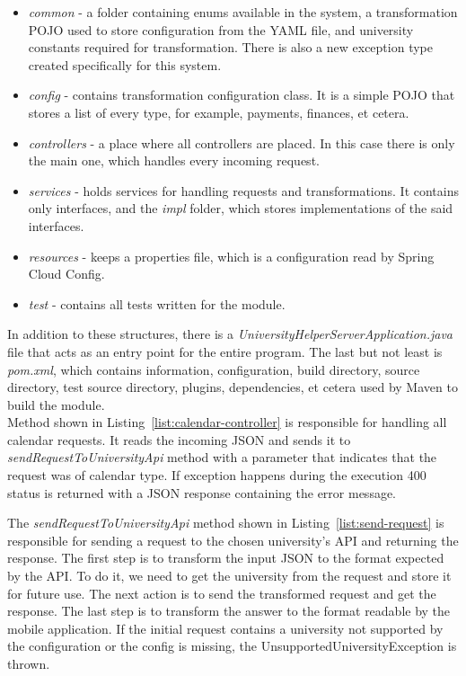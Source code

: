 \begin{itemize}
    \item \textit{common} - a folder containing enums available in the system, a transformation POJO used to store configuration from the YAML file, and university constants required for transformation. There is also a new exception type created specifically for this system.
    \item\textit{config} - contains transformation configuration class. It is a simple POJO that stores a list of every type, for example, payments, finances, et cetera.
    \item \textit{controllers} - a place where all controllers are placed. In this case there is only the main one, which handles every incoming request.
    \item \textit{services} - holds services for handling requests and transformations. It contains only interfaces, and the \textit{impl} folder, which stores implementations of the said interfaces.
    \item \textit{resources} - keeps a properties file, which is a configuration read by Spring Cloud Config.
    \item \textit{test} - contains all tests written for the module.
\end{itemize}

In addition to these structures, there is a \textit{UniversityHelperServerApplication.java} file that acts as an entry point for the entire program. The last but not least is \textit{pom.xml}, which contains information, configuration, build directory, source directory, test source directory, plugins, dependencies, et cetera used by Maven to build the module.\\

Method shown in Listing~\ref{list:calendar-controller} is responsible for handling all calendar requests. It reads the incoming JSON and sends it to \textit{sendRequestToUniversityApi} method with a parameter that indicates that the request was of calendar type. If exception happens during the execution 400 status is returned with a JSON response containing the error message.



The \textit{sendRequestToUniversityApi} method shown in Listing~\ref{list:send-request} is responsible for sending a request to the chosen university's API and returning the response. The first step is to transform the input JSON to the format expected by the API. To do it, we need to get the university from the request and store it for future use. The next action is to send the transformed request and get the response. The last step is to transform the answer to the format readable by the mobile application. If the initial request contains a university not supported by the configuration or the config is missing, the UnsupportedUniversityException is thrown.

